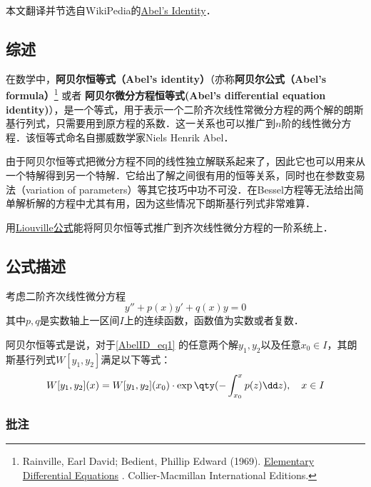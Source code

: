 
本文翻译并节选自WikiPedia的\href{https://en.wikipedia.org/wiki/Abel\%27s_identity}{Abel's Identity}．


\subsection{综述}

在数学中，\textbf{阿贝尔恒等式（Abel's identity）}（亦称\textbf{阿贝尔公式（Abel's formula）}\footnote{ Rainville, Earl David; Bedient, Phillip Edward (1969). \href{https://archive.org/details/elementarydiffer00rain}{ Elementary Differential Equations} . Collier-Macmillan International Editions.} 或者 \textbf{阿贝尔微分方程恒等式(Abel's differential equation identity)}），是一个等式，用于表示一个二阶齐次线性常微分方程的两个解的朗斯基行列式，只需要用到原方程的系数．这一关系也可以推广到$n$阶的线性微分方程．该恒等式命名自挪威数学家Niels Henrik Abel．

由于阿贝尔恒等式把微分方程不同的线性独立解联系起来了，因此它也可以用来从一个特解得到另一个特解．它给出了解之间很有用的恒等关系，同时也在参数变易法（variation of parameters）等其它技巧中功不可没．在Bessel方程等无法给出简单解析解的方程中尤其有用，因为这些情况下朗斯基行列式非常难算．

用\href{https://en.wikipedia.org/wiki/Liouville\%27s_formula}{Liouville公式}能将阿贝尔恒等式推广到齐次线性微分方程的一阶系统上．



\subsection{公式描述}

考虑二阶齐次线性微分方程
\begin{equation}\label{AbelID_eq1}
y'' + p(x)y' +q(x)y = 0
\end{equation}
其中$p, q$是实数轴上一区间$I$上的连续函数，函数值为实数或者复数．

阿贝尔恒等式是说，对于\autoref{AbelID_eq1} 的任意两个解$y_1, y_2$以及任意$x_0\in I$，其朗斯基行列式$W[y_1, y_2]$满足以下等式：
\begin{equation}
W[y_1, y_2](x) = W[y_1, y_2](x_0)\cdot \exp\qty(-\int _{x_0}^x p(z)\dd z), \quad x\in I
\end{equation}


\subsubsection{批注}

